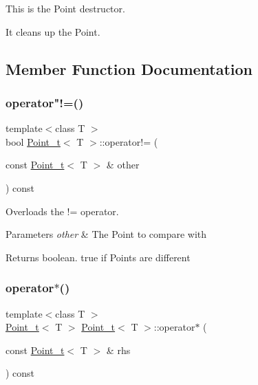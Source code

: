 This is the Point destructor. 

It cleans up the Point. 

\subsection{Member Function Documentation}
\mbox{\label{class_point__t_aa5f770c4e0b7e3fe1e426fdebc4cd0f9}} 
\subsubsection{\texorpdfstring{operator"!=()}{operator!=()}}
{\footnotesize\ttfamily template$<$class T $>$ \\
bool \hyperlink{class_point__t}{Point\+\_\+t}$<$ T $>$\+::operator!= (\begin{DoxyParamCaption}\item[{const \hyperlink{class_point__t}{Point\+\_\+t}$<$ T $>$ \&}]{other }\end{DoxyParamCaption}) const}



Overloads the != operator. 


\begin{DoxyParams}{Parameters}
{\em other} & The Point to compare with\\
\hline
\end{DoxyParams}
\begin{DoxyReturn}{Returns}
boolean. true if Points are different 
\end{DoxyReturn}
\mbox{\label{class_point__t_a56b84bb4471a147a920444370b5bd9bc}} 
\subsubsection{\texorpdfstring{operator$\ast$()}{operator*()}\hspace{0.1cm}{\footnotesize\ttfamily [1/2]}}
{\footnotesize\ttfamily template$<$class T $>$ \\
\hyperlink{class_point__t}{Point\+\_\+t}$<$ T $>$ \hyperlink{class_point__t}{Point\+\_\+t}$<$ T $>$\+::operator$\ast$ (\begin{DoxyParamCaption}\item[{const \hyperlink{class_point__t}{Point\+\_\+t}$<$ T $>$ \&}]{rhs }\end{DoxyParamCaption}) const}



